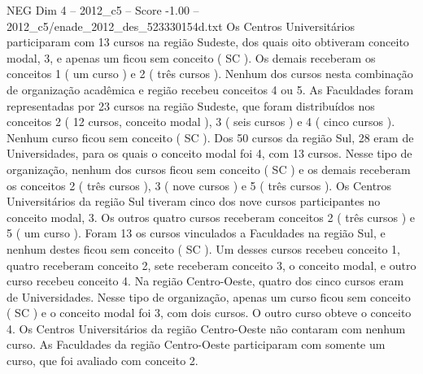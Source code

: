 \begin{textsample}{NEG Dim 4 – 2012\_c5 – Score -1.00 – 2012\_c5/enade\_2012\_des\_523330154d.txt}
Os Centros Universitários participaram com 13 cursos na região Sudeste, dos quais oito obtiveram conceito modal, 3, e apenas um ficou sem conceito ( SC ).
Os demais receberam os conceitos 1 ( um curso ) e 2 ( três cursos ).
Nenhum dos cursos nesta combinação de organização acadêmica e região recebeu conceitos 4 ou 5.
As Faculdades foram representadas por 23 cursos na região Sudeste, que foram distribuídos nos conceitos 2 ( 12 cursos, conceito modal ), 3 ( seis cursos ) e 4 ( cinco cursos ).
Nenhum curso ficou sem conceito ( SC ).
Dos 50 cursos da região Sul, 28 eram de Universidades, para os quais o conceito modal foi 4, com 13 cursos.
Nesse tipo de organização, nenhum dos cursos ficou sem conceito ( SC ) e os demais receberam os conceitos 2 ( três cursos ), 3 ( nove cursos ) e 5 ( três cursos ).
Os Centros Universitários da região Sul tiveram cinco dos nove cursos participantes no conceito modal, 3.
Os outros quatro cursos receberam conceitos 2 ( três cursos ) e 5 ( um curso ).
Foram 13 os cursos vinculados a Faculdades na região Sul, e nenhum destes ficou sem conceito ( SC ).
Um desses cursos recebeu conceito 1, quatro receberam conceito 2, sete receberam conceito 3, o conceito modal, e outro curso recebeu conceito 4.
Na região Centro-Oeste, quatro dos cinco cursos eram de Universidades.
Nesse tipo de organização, apenas um curso ficou sem conceito ( SC ) e o conceito modal foi 3, com dois cursos.
O outro curso obteve o conceito 4.
Os Centros Universitários da região Centro-Oeste não contaram com nenhum curso.
As Faculdades da região Centro-Oeste participaram com somente um curso, que foi avaliado com conceito 2.

\end{textsample}
